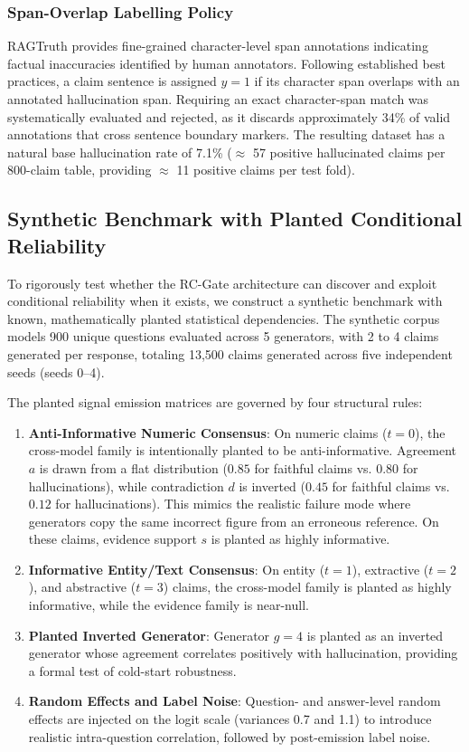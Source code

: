 \documentclass[pdflatex,sn-mathphys,Numbered]{sn-jnl}
\begin{document}
\subsubsection{Span-Overlap Labelling Policy}
RAGTruth provides fine-grained character-level span annotations indicating factual inaccuracies identified by human annotators. Following established best practices, a claim sentence is assigned $y=1$ if its character span overlaps with an annotated hallucination span. Requiring an exact character-span match was systematically evaluated and rejected, as it discards approximately 34\% of valid annotations that cross sentence boundary markers. The resulting dataset has a natural base hallucination rate of 7.1\% ($\approx$ 57 positive hallucinated claims per 800-claim table, providing $\approx$ 11 positive claims per test fold).

\subsection{Synthetic Benchmark with Planted Conditional Reliability}\label{subsec:synthetic_ds}

To rigorously test whether the RC-Gate architecture can discover and exploit conditional reliability when it exists, we construct a synthetic benchmark with known, mathematically planted statistical dependencies. The synthetic corpus models 900 unique questions evaluated across 5 generators, with 2 to 4 claims generated per response, totaling 13,500 claims generated across five independent seeds (seeds 0--4).

The planted signal emission matrices are governed by four structural rules:
\begin{enumerate}
    \item \textbf{Anti-Informative Numeric Consensus}: On numeric claims ($t=0$), the cross-model family is intentionally planted to be anti-informative. Agreement $a$ is drawn from a flat distribution ($0.85$ for faithful claims vs. $0.80$ for hallucinations), while contradiction $d$ is inverted ($0.45$ for faithful claims vs. $0.12$ for hallucinations). This mimics the realistic failure mode where generators copy the same incorrect figure from an erroneous reference. On these claims, evidence support $s$ is planted as highly informative.
    \item \textbf{Informative Entity/Text Consensus}: On entity ($t=1$), extractive ($t=2$), and abstractive ($t=3$) claims, the cross-model family is planted as highly informative, while the evidence family is near-null.
    \item \textbf{Planted Inverted Generator}: Generator $g=4$ is planted as an inverted generator whose agreement correlates positively with hallucination, providing a formal test of cold-start robustness.
    \item \textbf{Random Effects and Label Noise}: Question- and answer-level random effects are injected on the logit scale (variances 0.7 and 1.1) to introduce realistic intra-question correlation, followed by post-emission label noise.
\end{enumerate}
\end{document}
